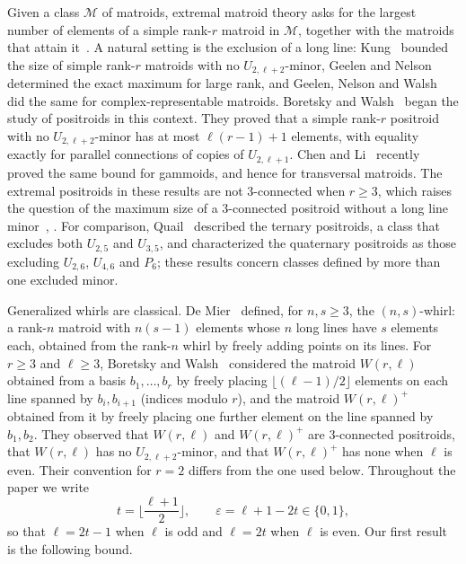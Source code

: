 \documentclass[11pt]{amsart}
\theoremstyle{definition}
\theoremstyle{remark}
\numberwithin{equation}{section}
\begin{document}
Given a class $\mathcal M$ of matroids, extremal matroid theory asks for the largest number of elements of a simple rank-$r$ matroid in $\mathcal M$, together with the matroids that attain it~\cite{Kun93}. A natural setting is the exclusion of a long line: Kung~\cite{Kun93} bounded the size of simple rank-$r$ matroids with no $U_{2,\ell+2}$-minor, Geelen and Nelson~\cite{GN10} determined the exact maximum for large rank, and Geelen, Nelson and Walsh~\cite{GNW24} did the same for complex-representable matroids. Boretsky and Walsh~\cite{BW25,BW26} began the study of positroids in this context. They proved that a simple rank-$r$ positroid with no $U_{2,\ell+2}$-minor has at most $\ell(r-1)+1$ elements, with equality exactly for parallel connections of copies of $U_{2,\ell+1}$. Chen and Li~\cite[Theorem~1.1 and Corollary~1.2]{CL26} recently proved the same bound for gammoids, and hence for transversal matroids. The extremal positroids in these results are not $3$-connected when $r\ge 3$, which raises the question of the maximum size of a $3$-connected positroid without a long line minor~\cite[Section~6.1]{BW25}, \cite[Section~7.1]{BW26v2}. For comparison, Quail~\cite[Theorem~3.8 and Proposition~3.12]{Qua24} described the ternary positroids, a class that excludes both $U_{2,5}$ and $U_{3,5}$, and characterized the quaternary positroids as those excluding $U_{2,6}$, $U_{4,6}$ and $P_6$; these results concern classes defined by more than one excluded minor.

Generalized whirls are classical. De Mier~\cite[Section~7.1.2, pp.~76--77]{dM03} defined, for $n,s\ge3$, the $(n,s)$-whirl: a rank-$n$ matroid with $n(s-1)$ elements whose $n$ long lines have $s$ elements each, obtained from the rank-$n$ whirl by freely adding points on its lines. For $r\ge3$ and $\ell\ge3$, Boretsky and Walsh~\cite[Section~6.1]{BW25} considered the matroid $W(r,\ell)$ obtained from a basis $b_1,\dots,b_r$ by freely placing $\lfloor(\ell-1)/2\rfloor$ elements on each line spanned by $b_i,b_{i+1}$ (indices modulo $r$), and the matroid $W(r,\ell)^+$ obtained from it by freely placing one further element on the line spanned by $b_1,b_2$. They observed that $W(r,\ell)$ and $W(r,\ell)^+$ are $3$-connected positroids, that $W(r,\ell)$ has no $U_{2,\ell+2}$-minor, and that $W(r,\ell)^+$ has none when $\ell$ is even. Their convention for $r=2$ differs from the one used below. Throughout the paper we write
\[
t=\Big\lfloor\frac{\ell+1}{2}\Big\rfloor,\qquad \varepsilon=\ell+1-2t\in\{0,1\},
\]
so that $\ell=2t-1$ when $\ell$ is odd and $\ell=2t$ when $\ell$ is even. Our first result is the following bound.
\end{document}
